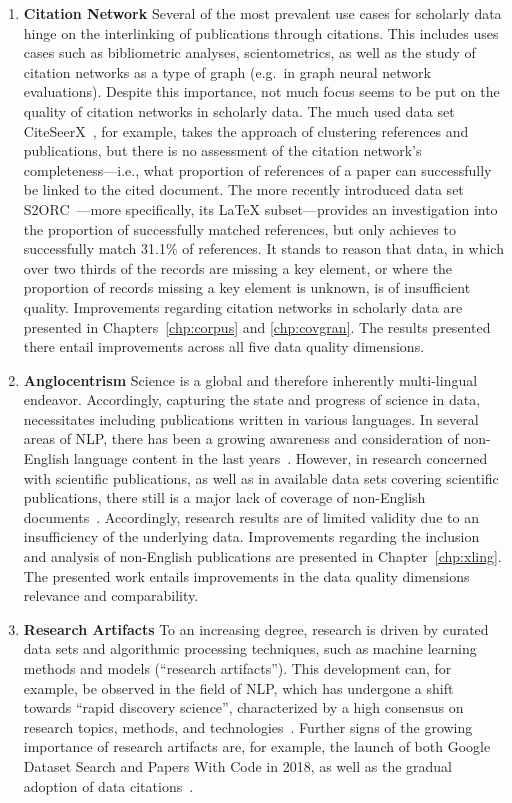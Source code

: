 \begin{enumerate}
    \item \textbf{Citation Network} Several of the most prevalent use cases for scholarly data hinge on the interlinking of publications through citations. This includes uses cases such as bibliometric analyses, scientometrics, as well as the study of citation networks as a type of graph (e.g.\ in graph neural network evaluations). Despite this importance, not much focus seems to be put on the quality of citation networks in scholarly data. The much used data set CiteSeerX~\cite{Wu2015,Wu2016,Patel2021}, for example, takes the approach of clustering references and publications, but there is no assessment of the citation network's completeness---i.e., what proportion of references of a paper can successfully be linked to the cited document. The more recently introduced data set S2ORC~\cite{Lo2020}---more specifically, its \LaTeX{} subset---provides an investigation into the proportion of successfully matched references, but only achieves to successfully match 31.1\% of references.
It stands to reason that data, in which over two thirds of the records are missing a key element, or where the proportion of records missing a key element is unknown, is of insufficient quality.
Improvements regarding citation networks in scholarly data are presented in Chapters~\ref{chp:corpus} and \ref{chp:covgran}. The results presented there entail improvements across all five data quality dimensions.
    \item \textbf{Anglocentrism} Science is a global and therefore inherently multi-lingual endeavor. Accordingly, capturing the state and progress of science in data, necessitates including publications written in various languages. In several areas of NLP, there has been a growing awareness and consideration of non-English language content in the last years~\cite{Dabre2020,Yu2022,Ramesh2023}. However, in research concerned with scientific publications, as well as in available data sets covering scientific publications, there still is a major lack of coverage of non-English documents~\cite{Vera-Baceta2019,Liu2019,Moed2018,Moskaleva2019,MartinMartin2021}.
Accordingly, research results are of limited validity due to an insufficiency of the underlying data.
Improvements regarding the inclusion and analysis of non-English publications are presented in Chapter~\ref{chp:xling}. The presented work entails improvements in the data quality dimensions relevance and comparability.
    \item \textbf{Research Artifacts} To an increasing degree, research is driven by curated data sets and algorithmic processing techniques, such as machine learning methods and models (``research artifacts''). This development can, for example, be observed in the field of NLP, which has undergone a shift towards ``rapid discovery science'', characterized by a high consensus on research topics, methods, and technologies~\cite{Jurgens2018}. Further signs of the growing importance of research artifacts are, for example, the launch of both Google Dataset Search and Papers With Code in 2018, as well as the gradual adoption of data citations~\cite{Kratz2015}.

\end{enumerate}
